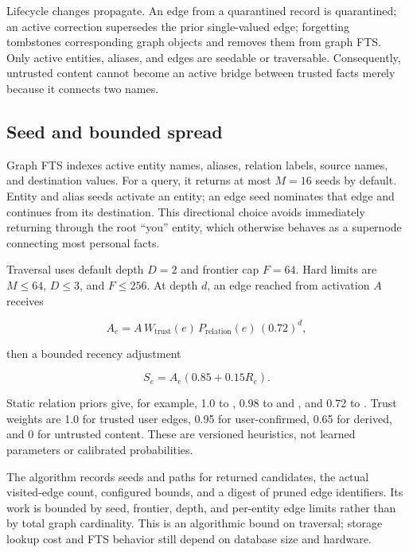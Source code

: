Lifecycle changes propagate. An edge from a quarantined record is quarantined; an active correction supersedes the prior single-valued edge; forgetting tombstones corresponding graph objects and removes them from graph FTS. Only active entities, aliases, and edges are seedable or traversable. Consequently, untrusted content cannot become an active bridge between trusted facts merely because it connects two names.

\subsection{Seed and bounded spread}

Graph FTS indexes active entity names, aliases, relation labels, source names, and destination values. For a query, it returns at most $M=16$ seeds by default. Entity and alias seeds activate an entity; an edge seed nominates that edge and continues from its destination. This directional choice avoids immediately returning through the root ``you'' entity, which otherwise behaves as a supernode connecting most personal facts.

Traversal uses default depth $D=2$ and frontier cap $F=64$. Hard limits are $M\le64$, $D\le3$, and $F\le256$. At depth $d$, an edge reached from activation $A$ receives

\begin{equation}
A_e=A\,W_{\mathrm{trust}}(e)\,P_{\mathrm{relation}}(e)\,(0.72)^d,
\label{eq:graph-activation}
\end{equation}

then a bounded recency adjustment

\begin{equation}
S_e=A_e(0.85+0.15R_e).
\end{equation}

Static relation priors give, for example, 1.0 to , 0.98 to  and , and 0.72 to . Trust weights are 1.0 for trusted user edges, 0.95 for user-confirmed, 0.65 for derived, and 0 for untrusted content. These are versioned heuristics, not learned parameters or calibrated probabilities.

The algorithm records seeds and paths for returned candidates, the actual visited-edge count, configured bounds, and a digest of pruned edge identifiers. Its work is bounded by seed, frontier, depth, and per-entity edge limits rather than by total graph cardinality. This is an algorithmic bound on traversal; storage lookup cost and FTS behavior still depend on database size and hardware.

